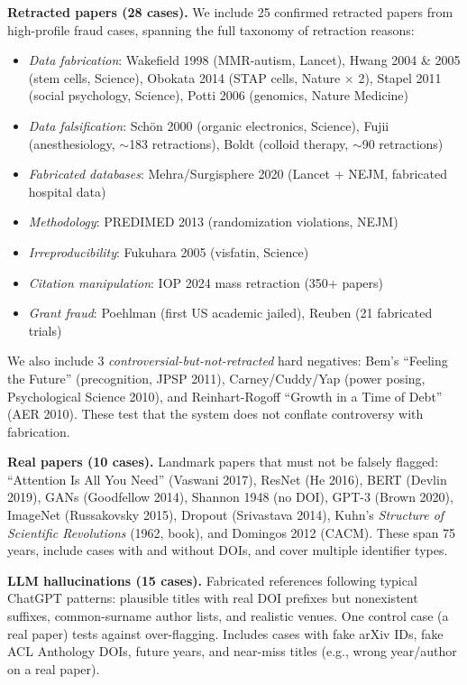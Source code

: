\documentclass[sigconf,nonacm]{acmart}
\begin{document}
\textbf{Retracted papers (28 cases).}
We include 25 confirmed retracted papers from high-profile fraud cases, spanning the full taxonomy of retraction reasons:
\begin{itemize}[leftmargin=*]
    \item \emph{Data fabrication}: Wakefield 1998 (MMR-autism, Lancet), Hwang 2004 \& 2005 (stem cells, Science), Obokata 2014 (STAP cells, Nature $\times$ 2), Stapel 2011 (social psychology, Science), Potti 2006 (genomics, Nature Medicine)
    \item \emph{Data falsification}: Sch\"{o}n 2000 (organic electronics, Science), Fujii (anesthesiology, $\sim$183 retractions), Boldt (colloid therapy, $\sim$90 retractions)
    \item \emph{Fabricated databases}: Mehra/Surgisphere 2020 (Lancet + NEJM, fabricated hospital data)
    \item \emph{Methodology}: PREDIMED 2013 (randomization violations, NEJM)
    \item \emph{Irreproducibility}: Fukuhara 2005 (visfatin, Science)
    \item \emph{Citation manipulation}: IOP 2024 mass retraction (350+ papers)
    \item \emph{Grant fraud}: Poehlman (first US academic jailed), Reuben (21 fabricated trials)
\end{itemize}

We also include 3 \emph{controversial-but-not-retracted} hard negatives: Bem's ``Feeling the Future'' (precognition, JPSP 2011), Carney/Cuddy/Yap (power posing, Psychological Science 2010), and Reinhart-Rogoff ``Growth in a Time of Debt'' (AER 2010).
These test that the system does not conflate controversy with fabrication.

\textbf{Real papers (10 cases).}
Landmark papers that must not be falsely flagged: ``Attention Is All You Need'' (Vaswani 2017), ResNet (He 2016), BERT (Devlin 2019), GANs (Goodfellow 2014), Shannon 1948 (no DOI), GPT-3 (Brown 2020), ImageNet (Russakovsky 2015), Dropout (Srivastava 2014), Kuhn's \emph{Structure of Scientific Revolutions} (1962, book), and Domingos 2012 (CACM).
These span 75 years, include cases with and without DOIs, and cover multiple identifier types.

\textbf{LLM hallucinations (15 cases).}
Fabricated references following typical ChatGPT patterns: plausible titles with real DOI prefixes but nonexistent suffixes, common-surname author lists, and realistic venues.
One control case (a real paper) tests against over-flagging.
Includes cases with fake arXiv IDs, fake ACL Anthology DOIs, future years, and near-miss titles (e.g., wrong year/author on a real paper).
\end{document}
